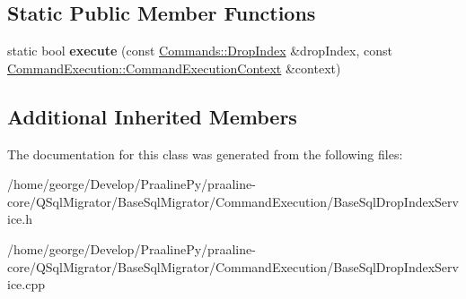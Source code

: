 \subsection*{Static Public Member Functions}
\begin{DoxyCompactItemize}
\item 
\mbox{\label{class_q_sql_migrator_1_1_command_execution_1_1_base_sql_drop_index_service_ae18a63b0b2c88794de6a32013fb76b58}} 
static bool {\bfseries execute} (const \hyperlink{class_q_sql_migrator_1_1_commands_1_1_drop_index}{Commands\+::\+Drop\+Index} \&drop\+Index, const \hyperlink{class_q_sql_migrator_1_1_command_execution_1_1_command_execution_context}{Command\+Execution\+::\+Command\+Execution\+Context} \&context)
\end{DoxyCompactItemize}
\subsection*{Additional Inherited Members}


The documentation for this class was generated from the following files\+:\begin{DoxyCompactItemize}
\item 
/home/george/\+Develop/\+Praaline\+Py/praaline-\/core/\+Q\+Sql\+Migrator/\+Base\+Sql\+Migrator/\+Command\+Execution/Base\+Sql\+Drop\+Index\+Service.\+h\item 
/home/george/\+Develop/\+Praaline\+Py/praaline-\/core/\+Q\+Sql\+Migrator/\+Base\+Sql\+Migrator/\+Command\+Execution/Base\+Sql\+Drop\+Index\+Service.\+cpp\end{DoxyCompactItemize}
